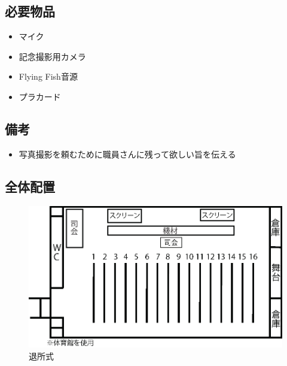 \subsection{必要物品}
\begin{itemize}
\item マイク
\item 記念撮影用カメラ
\item Flying Fish音源
\item プラカード
\end{itemize}
\subsection{備考}
\begin{itemize}
\item 写真撮影を頼むために職員さんに残って欲しい旨を伝える
\end{itemize}

\subsection{全体配置}
\begin{figure}[htbp]
  \begin{center}
  \includegraphics[width = 15cm]{./24/hyousyou.eps}
  \caption{退所式}
  \end{center}
\end{figure}

%
